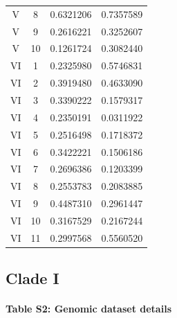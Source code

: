 \documentclass[
  11pt,
]{article}
\begin{document}
\begin{table}[H]
\begin{tabular}[t]{cccc}
V & 8 & 0.6321206 & 0.7357589\\
V & 9 & 0.2616221 & 0.3252607\\
V & 10 & 0.1261724 & 0.3082440\\
VI & 1 & 0.2325980 & 0.5746831\\
VI & 2 & 0.3919480 & 0.4633090\\
VI & 3 & 0.3390222 & 0.1579317\\
VI & 4 & 0.2350191 & 0.0311922\\
VI & 5 & 0.2516498 & 0.1718372\\
VI & 6 & 0.3422221 & 0.1506186\\
VI & 7 & 0.2696386 & 0.1203399\\
VI & 8 & 0.2553783 & 0.2083885\\
VI & 9 & 0.4487310 & 0.2961447\\
VI & 10 & 0.3167529 & 0.2167244\\
VI & 11 & 0.2997568 & 0.5560520\\
\bottomrule
\end{tabular}
\end{table}

\hypertarget{clade-i-1}{%
\subsection{Clade I}\label{clade-i-1}}

\hypertarget{table-s2-genomic-dataset-details}{%
\paragraph{Table S2: Genomic dataset details}\label{table-s2-genomic-dataset-details}}
\end{document}

